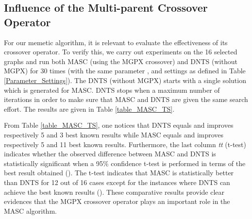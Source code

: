 \documentclass{elsart}
\begin{document}
\subsection{Influence of the Multi-parent Crossover Operator}
\label{subsec_sol_influence_Crossover}

For our memetic algorithm, it is relevant to evaluate the effectiveness of its crossover operator. To verify this, we carry out experiments on the 16 selected graphs and run both MASC (using the MGPX crossover) and DNTS (without MGPX) for 30 times (with the same parameter ,  and  settings as defined in Table \ref{Parameter_Settings}). The DNTS (without MGPX) starts with a single solution which is generated for MASC. DNTS stops when a maximum number of  iterations in order to make sure that MASC and DNTS are given the same search effort. The results are given in Table \ref{table_MASC_TS}. 

From Table \ref{table_MASC_TS}, one notices that DNTS equals and improves respectively 5 and 3 best known results while MASC equals and improves respectively 5 and 11 best known results. Furthermore, the last column \emph{tt} (t-test) indicates whether the observed difference between MASC and DNTS is statistically significant when a 95\% confidence t-test is performed in terms of the best result obtained (). The t-test indicates that MASC is statistically better than DNTS for 12 out of 16 cases except for the instances where DNTS can achieve the best known results (). These comparative results provide clear evidences that the MGPX crossover operator plays an important role in the MASC algorithm.
\end{document}
